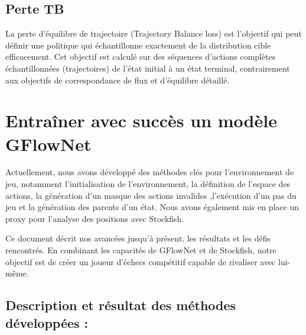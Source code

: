 \documentclass[11pt]{article}
\begin{document}
\subsection{Perte TB}
La perte d'équilibre de trajectoire (Trajectory Balance loss) est
l'objectif qui peut définir une politique qui échantillonne exactement
de la distribution cible efficacement. Cet objectif est calculé sur
des séquences d'actions complètes échantillonnées (trajectoires) de
l'état initial à un état terminal, contrairement aux objectifs de
correspondance de flux et d'équilibre détaillé.
\\
\section{Entraîner avec succès un modèle GFlowNet}
Actuellement, nous avons développé des méthodes clés pour
l'environnement de jeu, notamment l'initialisation de l'environnement,
la définition de l'espace des actions, la génération d'un masque des
actions invalides ,l'exécution d'un pas du jeu et la génération des
parents d'un état. Nous avons également mis en place un proxy pour
l'analyse des positions avec Stockfish.

Ce document décrit nos avancées jusqu'à présent, les résultats et les
défis rencontrés. En combinant les capacités de GFlowNet et de
Stockfish, notre objectif est de créer un joueur d'échecs compétitif
capable de rivaliser avec lui-même.
\subsection*{Description et résultat des méthodes développées :}




\end{document}

